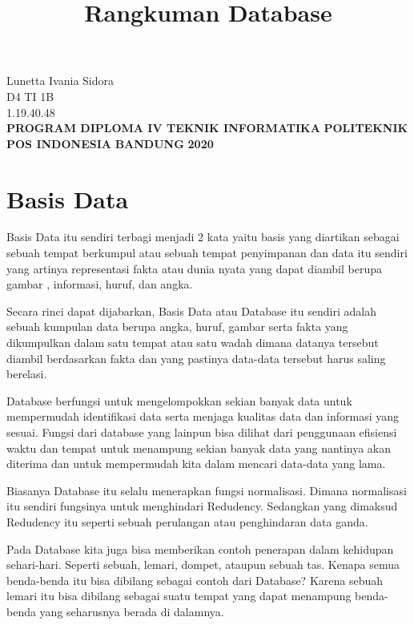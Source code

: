 \documentclass[a4paper, 12pt]{article}
\begin{document}
\title{\huge\textbf{Rangkuman Database}}
\date{}

\maketitle




\begin{center}
\vspace{4cm}
Lunetta Ivania Sidora\\
D4 TI 1B\\
1.19.40.48\\
\vspace{4cm}
\textbf{PROGRAM DIPLOMA IV TEKNIK INFORMATIKA} \linebreak
\textbf{POLITEKNIK POS INDONESIA} \linebreak
\textbf{BANDUNG}\linebreak
\textbf{2020}\\

\end{center}
\newpage

\section{Basis Data}
\par Basis Data itu sendiri terbagi menjadi 2 kata yaitu basis yang diartikan sebagai sebuah tempat berkumpul atau sebuah tempat penyimpanan dan data itu sendiri yang artinya representasi fakta atau dunia nyata yang dapat diambil berupa gambar , informasi, huruf, dan angka. 
\par Secara rinci dapat dijabarkan, Basis Data atau Database itu sendiri adalah sebuah kumpulan data berupa angka, huruf, gambar serta fakta yang dikumpulkan dalam satu tempat atau satu wadah dimana datanya tersebut diambil berdasarkan fakta dan yang pastinya data-data tersebut harus saling berelasi.
\par Database berfungsi untuk mengelompokkan sekian banyak data untuk mempermudah identifikasi data serta menjaga kualitas data dan informasi yang sesuai. Fungsi dari database yang lainpun bisa dilihat dari penggunaan efisiensi waktu dan tempat untuk menampung sekian banyak data yang nantinya akan diterima dan untuk mempermudah kita dalam mencari data-data yang lama. 
\par Biasanya Database itu selalu menerapkan fungsi normalisasi. Dimana normalisasi itu sendiri fungsinya untuk menghindari Redudency. Sedangkan yang dimaksud Redudency itu seperti sebuah perulangan atau penghindaran data ganda.
\par Pada Database kita juga bisa memberikan contoh penerapan dalam kehidupan sehari-hari. Seperti sebuah, lemari, dompet, ataupun sebuah tas. Kenapa semua benda-benda itu bisa dibilang sebagai contoh dari Database? Karena sebuah lemari itu bisa dibilang sebagai suatu tempat yang dapat menampung benda-benda yang seharusnya berada di dalamnya. 
\end{document}
